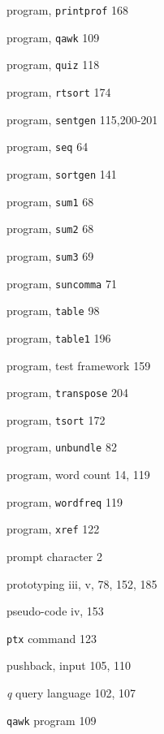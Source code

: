 \begin{multicols}{3}
\hangindent=3pc  program, \verb'printprof' 168

\hangindent=3pc  program, \verb'qawk' 109

\hangindent=3pc  program, \verb'quiz' 118

\hangindent=3pc  program, \verb'rtsort' 174

\hangindent=3pc  program, \verb'sentgen' 115,200-201

\hangindent=3pc  program, \verb'seq' 64

\hangindent=3pc  program, \verb'sortgen' 141

\hangindent=3pc  program, \verb'sum1' 68

\hangindent=3pc  program, \verb'sum2' 68

\hangindent=3pc  program, \verb'sum3' 69



\hangindent=3pc  program, \verb'suncomma' 71

\hangindent=3pc  program, \verb'table' 98

\hangindent=3pc  program, \verb'table1' 196

\hangindent=3pc  program, test framework 159

\hangindent=3pc  program, \verb'transpose' 204

\hangindent=3pc  program, \verb'tsort' 172

\hangindent=3pc  program, \verb'unbundle' 82

\hangindent=3pc  program, word count 14, 119

\hangindent=3pc  program, \verb'wordfreq' 119

\hangindent=3pc  program, \verb'xref' 122

\hangindent=3pc  prompt character 2

\hangindent=3pc  prototyping iii, v, 78, 152, 185

\hangindent=3pc  pseudo-code iv, 153

\hangindent=3pc  \verb'ptx' command 123

\hangindent=3pc  pushback, input 105, 110

\hangindent=3pc  \textit{q} query language 102, 107

\hangindent=3pc  \verb'qawk' program 109


\end{multicols}
